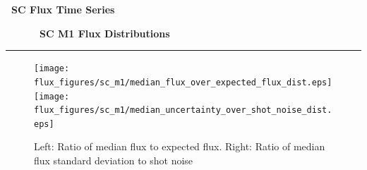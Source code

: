 \vspace{2in}
\centering
{\Huge {\bf \quarter\ SC Flux Time Series}}



\cleardoublepage
\begin{figure}[h!]
  \centering
  \hfill
  {\Huge {\bf \quarter\ SC M1 Flux Distributions}}
  \hfill
\end{figure}
\hrule

\begin{figure}[h!]
  \centering
  \texttt{[image: flux\_figures/sc\_m1/median\_flux\_over\_expected\_flux\_dist.eps]}
  \texttt{[image: flux\_figures/sc\_m1/median\_uncertainty\_over\_shot\_noise\_dist.eps]}
  \caption{Left: Ratio of median flux to expected flux.  Right: Ratio of median flux standard deviation to shot noise}
\end{figure}



%
%
%
%
%
%
%
%
